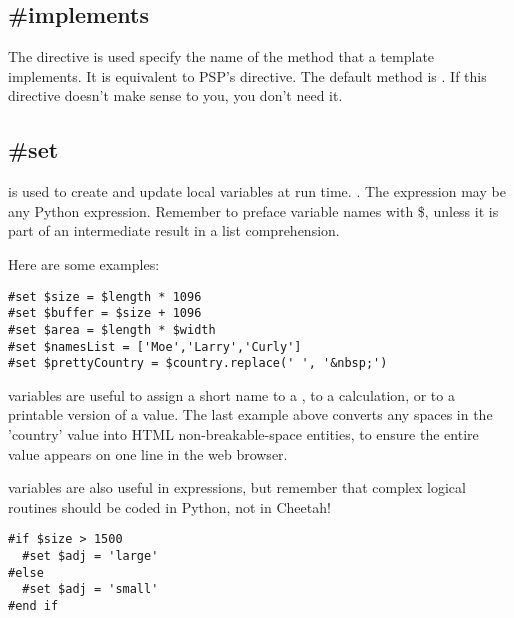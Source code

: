 \subsection{\#implements}
\label{inheritanceEtc.implements}

The  directive is used specify the name of the method that a
template implements.  It is equivalent to PSP's  directive.
The default method is .  If this directive doesn't make sense
to you, you don't need it.



\subsection{\#set}
\label{inheritanceEtc.set}

 is used to create and update local variables at run time.
. The expression may be any Python expression.
Remember to preface variable names with \$, unless it is part of an
intermediate result in a list comprehension.

Here are some examples:
\begin{verbatim}
#set $size = $length * 1096
#set $buffer = $size + 1096
#set $area = $length * $width
#set $namesList = ['Moe','Larry','Curly']
#set $prettyCountry = $country.replace(' ', '&nbsp;')
\end{verbatim}

 variables are useful to assign a short name to a
, to a calculation, or to a printable version of
a value.  The last example above converts any spaces in the 'country' value
into HTML non-breakable-space entities, to ensure the entire value appears on
one line in the web browser.

 variables are also useful in  expressions, but
remember that complex logical routines should be coded in Python, not in
Cheetah!
\begin{verbatim}
#if $size > 1500
  #set $adj = 'large'
#else
  #set $adj = 'small'
#end if
\end{verbatim}


